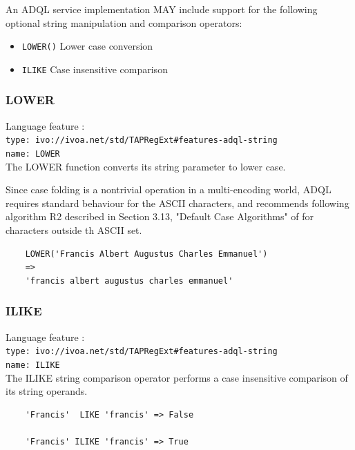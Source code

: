 \documentclass[11pt,a4paper]{ivoa}
\begin{document}
An ADQL service implementation MAY include support for the following optional
string manipulation and comparison operators:

\begin{itemize}
    \item \verb:LOWER(): Lower case conversion
    \item \verb:ILIKE: Case insensitive comparison
\end{itemize}

\subsubsection{LOWER}
\label{sec:string.functions.lower}
{\footnotesize Language feature :}\\
{\footnotesize \verb|type: ivo://ivoa.net/std/TAPRegExt#features-adql-string|}\\
{\footnotesize \verb|name: LOWER|}\\

The LOWER function converts its string parameter to lower case.

Since case folding is a nontrivial operation in a multi-encoding world,
ADQL requires standard behaviour for the ASCII characters, and recommends
following algorithm R2 described in Section 3.13, "Default Case Algorithms"
of \citet{std:UNICODE} for characters outside th ASCII set.

\begin{verbatim}
    LOWER('Francis Albert Augustus Charles Emmanuel')
    =>
    'francis albert augustus charles emmanuel'
\end{verbatim}

\subsubsection{ILIKE}
\label{sec:string.functions.ilike}
{\footnotesize Language feature :}\\
{\footnotesize \verb|type: ivo://ivoa.net/std/TAPRegExt#features-adql-string|}\\
{\footnotesize \verb|name: ILIKE|}\\

The ILIKE string comparison operator performs a case insensitive comparison
of its string operands.

\begin{verbatim}
    'Francis'  LIKE 'francis' => False

    'Francis' ILIKE 'francis' => True
\end{verbatim}
\end{document}
